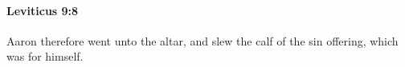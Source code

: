 
		\paragraph{Leviticus 9:8} %
			\label{LEVITICUS-9-8}

			Aaron therefore went unto the altar, and slew the calf of the sin offering, which was for himself.



